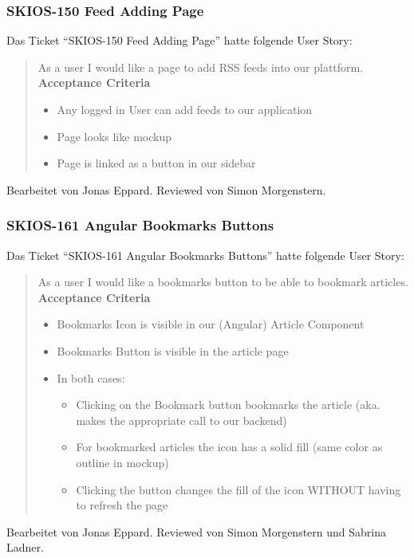 \subsubsection{SKIOS-150 Feed Adding Page} \label{story:150}
Das Ticket \enquote{SKIOS-150 Feed Adding Page} hatte folgende User Story:
\begin{quotation}
    As a user I would like a page to add RSS feeds into our plattform.
\textbf{Acceptance Criteria}
\begin{itemize}
    \item Any logged in User can add feeds to our application
    \item Page looks like mockup
    \item Page is linked as a button in our sidebar
\end{itemize}
\end{quotation}
Bearbeitet von Jonas Eppard.
Reviewed von Simon Morgenstern.

\subsubsection{SKIOS-161 Angular Bookmarks Buttons}
Das Ticket \enquote{SKIOS-161 Angular Bookmarks Buttons} hatte folgende User Story:
\begin{quotation}
    As a user I would like a bookmarks button to be able to bookmark articles.
\textbf{Acceptance Criteria}
\begin{itemize}
    \item Bookmarks Icon is visible in our (Angular) Article Component
    \item Bookmarks Button is visible in the article page
    \item In both cases:
    \begin{itemize}
        \item Clicking on the Bookmark button bookmarks the article (aka. makes the appropriate call to our backend)
        \item For bookmarked articles the icon has a solid fill (same color as outline in mockup)
        \item Clicking the button changes the fill of the icon WITHOUT having to refresh the page
    \end{itemize}
\end{itemize}
\end{quotation}
Bearbeitet von Jonas Eppard.
Reviewed von Simon Morgenstern und Sabrina Ladner.

